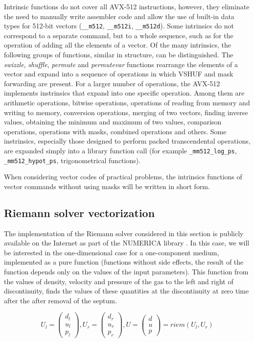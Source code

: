 \documentclass[
11pt,%
tightenlines,%
twoside,%
onecolumn,%
nofloats,%
nobibnotes,%
nofootinbib,%
superscriptaddress,%
noshowpacs,%
centertags]%
{revtex4}
\begin{document}
Intrinsic functions do not cover all AVX-512 instructions, however, they eliminate the need to manually write assembler code and allow the use of built-in data types for 512-bit vectors (\texttt{\_\_m512}, \texttt{\_\_m512i}, \texttt{\_\_m512d}).
Some intrinsics do not correspond to a separate command, but to a whole sequence, such as for the operation of adding all the elements of a vector.
Of the many intrinsics, the following groups of functions, similar in structure, can be distinguished.
The \textit{swizzle}, \textit{shuffle}, \textit{permute} and \textit{permutevar} functions rearrange the elements of a vector and expand into a sequence of operations in which VSHUF and mask forwarding are present.
For a larger number of operations, the AVX-512 implements instrinsics that expand into one specific operation.
Among them are arithmetic operations, bitwise operations, operations of reading from memory and writing to memory, conversion operations, merging of two vectors, finding inverse values, obtaining the minimum and maximum of two values, comparison operations, operations with masks, combined operations and others.
Some instrinsics, especially those designed to perform packed transcendental operations, are expanded simply into a library function call (for example \texttt{\_mm512\_log\_ps}, \texttt{\_mm512\_hypot\_ps}, trigonometrical functions).

When considering vector codes of practical problems, the intrinsics functions of vector commands without using masks will be written in short form.

\subsection{Riemann solver vectorization}

The implementation of the Riemann solver considered in this section is publicly available on the Internet as part of the NUMERICA library \cite{Numerica}.
In this case, we will be interested in the one-dimensional case for a one-component medium, implemented as a pure function (functions without side effects, the result of the function depends only on the values of the input parameters).
This function from the values of density, velocity and pressure of the gas to the left and right of discontinuity, finds the values of these quantities at the discontinuity at zero time after the after removal of the septum.

\begin{equation}\label{eq:riemann}
U_l = \left( \begin{array}{ccc} d_l \\ u_l \\ p_l \end{array} \right),
U_r = \left( \begin{array}{ccc} d_r \\ u_r \\ p_r \end{array} \right),
U = \left( \begin{array}{ccc} d \\ u \\ p \end{array} \right) = riem(U_l, U_r)
\end{equation}
\end{document}
